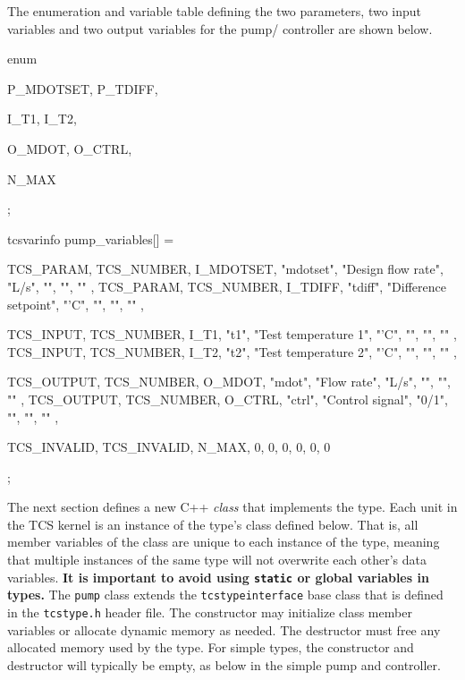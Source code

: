 \documentclass{article}
\begin{document}
The enumeration and variable table defining the two parameters, two input variables and two output variables for the pump/ controller are shown below.

\begin{verbatimtab}[4]
enum {	P_MDOTSET,
        P_TDIFF,

        I_T1,
		I_T2,

		O_MDOT,
		O_CTRL,

		N_MAX };

tcsvarinfo pump_variables[] = {

{ TCS_PARAM, TCS_NUMBER,   I_MDOTSET, "mdotset", "Design flow rate",    "L/s", "", "", "" },
{ TCS_PARAM, TCS_NUMBER,   I_TDIFF,   "tdiff",   "Difference setpoint", "'C",  "", "", "" },

{ TCS_INPUT, TCS_NUMBER,   I_T1,      "t1",      "Test temperature 1",  "'C",  "", "", "" },
{ TCS_INPUT, TCS_NUMBER,   I_T2,      "t2",      "Test temperature 2",  "'C",  "", "", "" },

{ TCS_OUTPUT, TCS_NUMBER,  O_MDOT,    "mdot",    "Flow rate",           "L/s", "", "", "" },
{ TCS_OUTPUT, TCS_NUMBER,  O_CTRL,    "ctrl",    "Control signal",      "0/1", "", "", "" },
	
{ TCS_INVALID, TCS_INVALID,  N_MAX,   0,         0, 0, 0, 0, 0 } };


\end{verbatimtab}
The next section defines a new C++ \emph{class} that implements the type.  Each unit in the TCS kernel is an instance of the type's class defined below.  That is, all member variables of the class are unique to each instance of the type, meaning that multiple instances of the same type will not overwrite each other's data variables.  \textbf{It is important to avoid using \texttt{static} or global variables in types.}  The \texttt{pump} class extends the \texttt{tcstypeinterface} base class that is defined in the \texttt{tcstype.h} header file.  The constructor may initialize class member variables or allocate dynamic memory as needed.  The destructor must free any allocated memory used by the type.  For simple types, the constructor and destructor will typically be empty, as below in the simple pump and controller.

\begin{verbatimtab}[4]
class pump : public tcstypeinterface
{
private:
	/* declare storage variables here */
public:
	pump( tcscontext *cxt, tcstypeinfo *ti )
		: tcstypeinterface( cxt, ti )
	{
	}

	virtual ~pump()
	{
	}
\end{verbatimtab}
\end{document}
